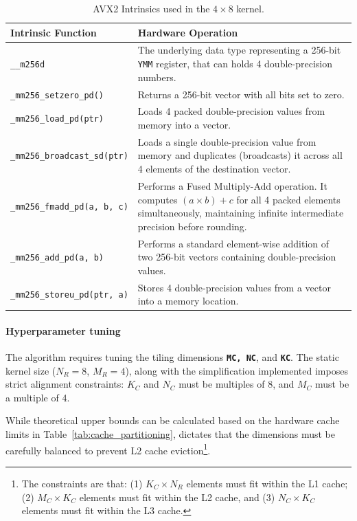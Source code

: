 \begin{table}[H]
\centering
\caption{AVX2 Intrinsics used in the $4 \times 8$ kernel.}
\label{tab:avx_intrinsics}
\begin{tabular}{lp{10cm}}
\toprule
\textbf{Intrinsic Function} & \textbf{Hardware Operation} \\
\midrule
\texttt{\_\_m256d} & The underlying data type representing a 256-bit \texttt{YMM} register, that can holds 4 double-precision numbers. \\
\midrule
\texttt{\_mm256\_setzero\_pd()} & Returns a 256-bit vector with all bits set to zero.\\
\midrule
\texttt{\_mm256\_load\_pd(ptr)} & Loads 4 packed double-precision values from memory into a vector.\\
\midrule
\texttt{\_mm256\_broadcast\_sd(ptr)} & Loads a single double-precision value from memory and duplicates (broadcasts) it across all 4 elements of the destination vector. \\
\midrule
\texttt{\_mm256\_fmadd\_pd(a, b, c)} & Performs a Fused Multiply-Add operation. It computes $(a \times b) + c$ for all 4 packed elements simultaneously, maintaining infinite intermediate precision before rounding. \\
\midrule
\texttt{\_mm256\_add\_pd(a, b)} & Performs a standard element-wise addition of two 256-bit vectors containing double-precision values. \\
\midrule
\texttt{\_mm256\_storeu\_pd(ptr, a)} & Stores 4 double-precision values from a vector into a  memory location.\\
\bottomrule
\end{tabular}
\end{table}

\paragraph{Hyperparameter tuning}
The algorithm requires tuning the tiling dimensions \texttt{\textbf{MC, NC}}, and \texttt{\textbf{KC}}. The static kernel size ($N_R = 8$, $M_R = 4$), along with the simplification implemented imposes strict alignment constraints: $K_C$ and $N_C$ must be multiples of 8, and $M_C$ must be a multiple of 4.

While theoretical upper bounds can be calculated based on the hardware cache limits in Table~\ref{tab:cache_partitioning}, dictates that the dimensions must be carefully balanced to prevent L2 cache eviction\footnote{The constraints are that: (1) $K_C \times N_R$ elements must fit within the L1 cache; (2) $M_C \times K_C$ elements must fit within the L2 cache, and (3) $N_C \times K_C$ elements must fit within the L3 cache.}.

